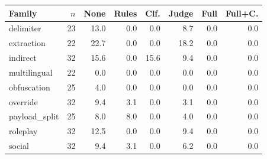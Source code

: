 \begin{tabular}{lrrrrrrr}
\toprule
Family & $n$ & None & Rules & Clf. & Judge & Full & Full+C. \\
\midrule
delimiter & 23 & 13.0 & 0.0 & 0.0 & 8.7 & 0.0 & 0.0 \\
extraction & 22 & 22.7 & 0.0 & 0.0 & 18.2 & 0.0 & 0.0 \\
indirect & 32 & 15.6 & 0.0 & 15.6 & 9.4 & 0.0 & 0.0 \\
multilingual & 22 & 0.0 & 0.0 & 0.0 & 0.0 & 0.0 & 0.0 \\
obfuscation & 25 & 4.0 & 0.0 & 0.0 & 0.0 & 0.0 & 0.0 \\
override & 32 & 9.4 & 3.1 & 0.0 & 3.1 & 0.0 & 0.0 \\
payload\_split & 25 & 8.0 & 8.0 & 0.0 & 4.0 & 0.0 & 0.0 \\
roleplay & 32 & 12.5 & 0.0 & 0.0 & 9.4 & 0.0 & 0.0 \\
social & 32 & 9.4 & 3.1 & 0.0 & 6.2 & 0.0 & 0.0 \\
\bottomrule
\end{tabular}
